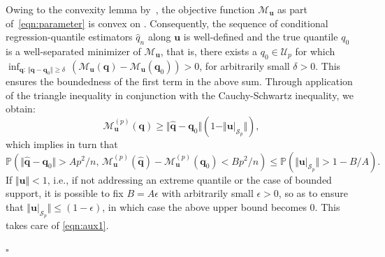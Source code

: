 \documentclass[aos]{imsart}
\theoremstyle{plain}
\theoremstyle{remark}
\def\R{\mathbb{R}}
\newcommand{\Mcal}{\mathcal{M}}
\newcommand{\Scal}{\mathcal{S}}
\newcommand{\bb}[1]{\boldsymbol{#1}}
\newcommand{\bbhat}[1]{\widehat{\boldsymbol{#1}}}
\newcommand{\prob}{\mathbb{P}}
\newcommand{\sredit}[1]{ {\color{myblue}{#1}} }
\newcommand{\cnam}[1]{\textcolor{mypurple}{#1}}
\newenvironment{pfofThm}{\noindent{\bf Proof of Theorem}}{\hfill $\square$ \\}
\begin{document}
\begin{pfofThm}
   
   
    Owing to the convexity lemma by~\citet{Pollard1991}, the objective function $\mathcal{M}_{\bb{u}}$ as part of~\eqref{eqn:parameter} is convex on \sredit{$\mathcal{Q}_p$}. Consequently, the sequence of conditional regression-quantile estimators $\hat{q}_n$ along $\bb{u}$ is well-defined and the true quantile $q_0$ is a well-separated minimizer of $\mathcal{M}_{\bb{u}}$, that is, there exists a $q_0 \in \mathcal{U}_p$ for which $\inf_{\bb{q}: \, \Vert \bb{q} -\bb{q}_0 \Vert \geqslant \delta }\, \left(\mathcal{M}_{\bb{u}} (\bb{q})- \mathcal{M}_{\bb{u}} (\bb{q}_0) \right) >0$, for arbitrarily small $\delta>0$. This ensures the boundedness of the first term in the above sum. Through application of the triangle inequality in conjunction with the Cauchy-Schwartz inequality, we obtain:
    \begin{equation*}
        \Mcal_{\bb{u}}^{(p)}(\bb{q}) \geq \Vert \bbhat{q} - \bb{q}_0\Vert (1 - \Vert \bb{u}\vert_{\Scal_p} \Vert),
    \end{equation*}
   which implies in turn that
    \begin{equation*}
        \prob\left( \Vert \bbhat{q} - \bb{q}_0 \Vert > A p^2/n, \,\Mcal_{\bb{u}}^{(p)}(\bbhat{q}) - \Mcal_{\bb{u}}^{(p)}(\bb{q}_0) < Bp^2/n \right)
        \leq \prob\left( \Vert \bb{u}\vert_{\Scal_p} \Vert > 1 - B/A \right).
    \end{equation*}
 If $\Vert \bb{u}\Vert < 1$, i.e., if not addressing an extreme quantile or the case of bounded support, it is possible to fix $B = A\epsilon$ with arbitrarily small $\epsilon > 0$, so as to ensure that $\Vert \bb{u}\vert_{\Scal_p} \Vert \leq (1-\epsilon)$, \cnam{in which case the above upper bound becomes 0. This takes care of \eqref{eqn:aux1}. }

\end{pfofThm}
\end{document}

